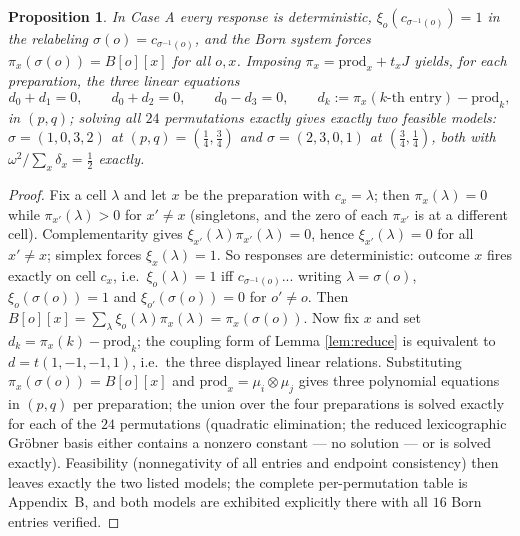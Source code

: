\documentclass[11pt,a4paper]{article}
\newtheorem{proposition}{Proposition}
\newcommand{\dd}{\delta}
\begin{document}
\begin{proposition}
\label{prop:caseA}
In Case A every response is deterministic, $\xi_o(c_{\sigma^{-1}(o)})=1$ in the relabeling $\sigma(o)=c_{\sigma^{-1}(o)}$, and the Born system forces $\pi_x(\sigma(o))=B[o][x]$ for all $o,x$. Imposing $\pi_x=\mathrm{prod}_x+t_xJ$ yields, for each preparation, the three linear equations
\[
d_0+d_1=0,\qquad d_0+d_2=0,\qquad d_0-d_3=0,\qquad d_k:=\pi_x(\text{$k$-th entry})-\mathrm{prod}_k ,
\]
in $(p,q)$; solving all $24$ permutations exactly gives exactly two feasible models:
$\sigma=(1,0,3,2)$ at $(p,q)=(\tfrac14,\tfrac34)$ and $\sigma=(2,3,0,1)$ at $(\tfrac34,\tfrac14)$, both with $\omega^2/\sum_x\dd_x=\tfrac12$ exactly.
\end{proposition}
\begin{proof}
Fix a cell $\lambda$ and let $x$ be the preparation with $c_x=\lambda$; then $\pi_x(\lambda)=0$ while $\pi_{x'}(\lambda)>0$ for $x'\ne x$ (singletons, and the zero of each $\pi_{x'}$ is at a different cell). Complementarity gives $\xi_{x'}(\lambda)\pi_{x'}(\lambda)=0$, hence $\xi_{x'}(\lambda)=0$ for all $x'\ne x$; simplex forces $\xi_x(\lambda)=1$. So responses are deterministic: outcome $x$ fires exactly on cell $c_x$, i.e.\ $\xi_o(\lambda)=1$ iff $c_{\sigma^{-1}(o)}$... writing $\lambda=\sigma(o)$, $\xi_o(\sigma(o))=1$ and $\xi_{o'}(\sigma(o))=0$ for $o'\ne o$. Then $B[o][x]=\sum_\lambda\xi_o(\lambda)\pi_x(\lambda)=\pi_x(\sigma(o))$. Now fix $x$ and set $d_k=\pi_x(k)-\mathrm{prod}_k$; the coupling form of Lemma \ref{lem:reduce} is equivalent to $d=t(1,-1,-1,1)$, i.e.\ the three displayed linear relations. Substituting $\pi_x(\sigma(o))=B[o][x]$ and $\mathrm{prod}_x=\mu_i\otimes\mu_j$ gives three polynomial equations in $(p,q)$ per preparation; the union over the four preparations is solved exactly for each of the $24$ permutations (quadratic elimination; the reduced lexicographic Gr\"obner basis either contains a nonzero constant --- no solution --- or is solved exactly). Feasibility (nonnegativity of all entries and endpoint consistency) then leaves exactly the two listed models; the complete per-permutation table is Appendix~B, and both models are exhibited explicitly there with all $16$ Born entries verified.
\end{proof}
\end{document}
